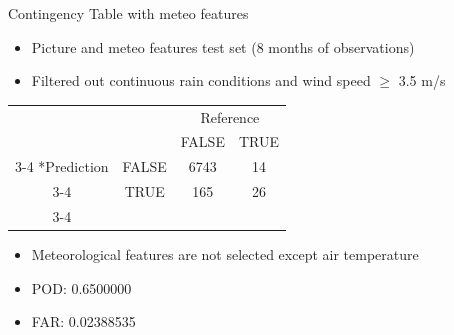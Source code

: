 \documentclass[10pt,fleqn]{beamer}\usepackage[]{graphicx}\usepackage[]{color}
\begin{document}
\begin{frame}{Contingency Table with meteo features}\centering
% 
\begin{itemize}
\item {Picture and meteo features test set (8 months of observations)}
\item{Filtered out continuous rain conditions and wind speed $\geq$ 3.5 m/s}
% 
\end{itemize}
\begin{table}
    \begin{tabular}{cc|c|c|}
       & \multicolumn{1}{c}{} & \multicolumn{2}{c}{Reference}\\
       & \multicolumn{1}{c}{} & \multicolumn{1}{c}{FALSE}  & \multicolumn{1}{c}{TRUE} \\\cline{3-4}
       \multirow{2}*{Prediction}  & FALSE & 6743  & 14 \\\cline{3-4}
      & TRUE & 165 & 26 \\\cline{3-4}
    \end{tabular}
  \end{table}
  
  \begin{itemize}
\item {Meteorological features are not selected except air temperature}
\item{POD: 0.6500000}
\item{FAR: 0.02388535}


% 
\end{itemize}
 
 \end{frame}
\end{document}
